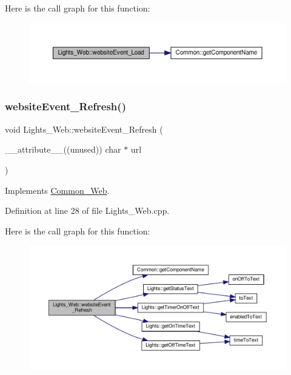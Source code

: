 Here is the call graph for this function\+:
\nopagebreak
\begin{figure}[H]
\begin{center}
\leavevmode
\includegraphics[width=350pt]{class_lights___web_afab1fbd6391d25ab5f382b89d4a02b5e_cgraph}
\end{center}
\end{figure}
\mbox{\label{class_lights___web_af46bb9ec74ecb0f45b465c2722b9b18a}} 
\subsubsection{\texorpdfstring{website\+Event\+\_\+\+Refresh()}{websiteEvent\_Refresh()}}
{\footnotesize\ttfamily void Lights\+\_\+\+Web\+::website\+Event\+\_\+\+Refresh (\begin{DoxyParamCaption}\item[{\+\_\+\+\_\+attribute\+\_\+\+\_\+((unused)) char $\ast$}]{url }\end{DoxyParamCaption})\hspace{0.3cm}{\ttfamily [virtual]}}



Implements \hyperlink{class_common___web_aaca7c54fdcf908e4e1256b7b1f6fc212}{Common\+\_\+\+Web}.



Definition at line 28 of file Lights\+\_\+\+Web.\+cpp.

Here is the call graph for this function\+:
\nopagebreak
\begin{figure}[H]
\begin{center}
\leavevmode
\includegraphics[width=350pt]{class_lights___web_af46bb9ec74ecb0f45b465c2722b9b18a_cgraph}
\end{center}
\end{figure}


